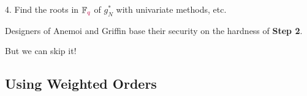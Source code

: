 \documentclass[aspectratio=169]{beamer}
\newcommand\q{{\textcolor{purple}{q}}}
\begin{document}
\begin{frame}
\begin{tabular}{cccc}
  \end{tabular}

  \medskip

  4. Find the roots in $\mathbb{F}_\q$ of $g_N^*$ with univariate methods, etc.

  \medskip

  Designers of Anemoi and Griffin base their security on the hardness of \textbf{Step 2}.

  \pause
  \begin{center}
    \textcolor{myred}{But we can skip it!}
    
    \vspace{-5.3cm}\hspace{-1.6cm}
  \end{center}


  
\end{frame}





\subsection{Using Weighted Orders}
\end{document}
